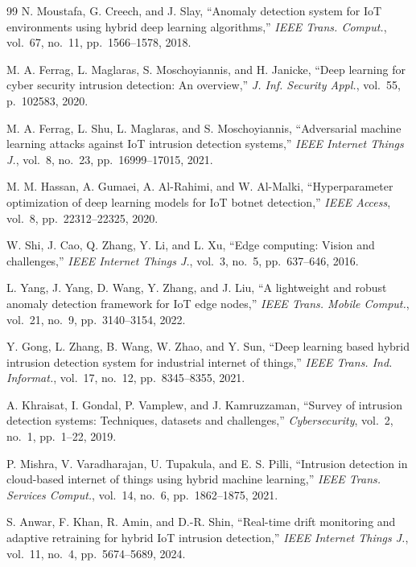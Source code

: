 \documentclass[journal]{IEEEtran}
\begin{document}
\begin{thebibliography}{99}
N. Moustafa, G. Creech, and J. Slay, ``Anomaly detection system for {IoT} environments using hybrid deep learning algorithms,'' \textit{IEEE Trans. Comput.}, vol.~67, no.~11, pp.~1566--1578, 2018.

M. A. Ferrag, L. Maglaras, S. Moschoyiannis, and H. Janicke, ``Deep learning for cyber security intrusion detection: An overview,'' \textit{J. Inf. Security Appl.}, vol.~55, p.~102583, 2020.

M. A. Ferrag, L. Shu, L. Maglaras, and S. Moschoyiannis, ``Adversarial machine learning attacks against {IoT} intrusion detection systems,'' \textit{IEEE Internet Things J.}, vol.~8, no.~23, pp.~16999--17015, 2021.

M. M. Hassan, A. Gumaei, A. Al-Rahimi, and W. Al-Malki, ``Hyperparameter optimization of deep learning models for {IoT} botnet detection,'' \textit{IEEE Access}, vol.~8, pp.~22312--22325, 2020.

W. Shi, J. Cao, Q. Zhang, Y. Li, and L. Xu, ``Edge computing: Vision and challenges,'' \textit{IEEE Internet Things J.}, vol.~3, no.~5, pp.~637--646, 2016.

L. Yang, J. Yang, D. Wang, Y. Zhang, and J. Liu, ``A lightweight and robust anomaly detection framework for {IoT} edge nodes,'' \textit{IEEE Trans. Mobile Comput.}, vol.~21, no.~9, pp.~3140--3154, 2022.

Y. Gong, L. Zhang, B. Wang, W. Zhao, and Y. Sun, ``Deep learning based hybrid intrusion detection system for industrial internet of things,'' \textit{IEEE Trans. Ind. Informat.}, vol.~17, no.~12, pp.~8345--8355, 2021.

A. Khraisat, I. Gondal, P. Vamplew, and J. Kamruzzaman, ``Survey of intrusion detection systems: Techniques, datasets and challenges,'' \textit{Cybersecurity}, vol.~2, no.~1, pp.~1--22, 2019.

P. Mishra, V. Varadharajan, U. Tupakula, and E. S. Pilli, ``Intrusion detection in cloud-based internet of things using hybrid machine learning,'' \textit{IEEE Trans. Services Comput.}, vol.~14, no.~6, pp.~1862--1875, 2021.

S. Anwar, F. Khan, R. Amin, and D.-R. Shin, ``Real-time drift monitoring and adaptive retraining for hybrid {IoT} intrusion detection,'' \textit{IEEE Internet Things J.}, vol.~11, no.~4, pp.~5674--5689, 2024.


\end{thebibliography}
\end{document}
